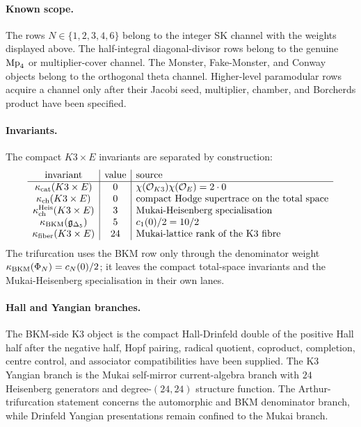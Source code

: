 \paragraph{Known scope.}
The rows $N\in\{1,2,3,4,6\}$ belong to the integer SK channel with
the weights displayed above. The half-integral diagonal-divisor rows
belong to the genuine $\mathrm{Mp}_4$ or multiplier-cover channel. The Monster,
Fake-Monster, and Conway objects belong to the orthogonal theta channel.
Higher-level paramodular rows acquire a channel only after their Jacobi
seed, multiplier, chamber, and Borcherds product have been specified.

\paragraph{Invariants.}
The compact $K3\times E$ invariants are separated by construction:
\[
\begin{array}{c|c|l}
\text{invariant} & \text{value} & \text{source}\\ \hline
\kappa_{\mathrm{cat}}(K3\times E) & 0 &
\chi(\mathcal O_{K3})\chi(\mathcal O_E)=2\cdot 0\\
\kappa_{\mathrm{ch}}(K3\times E) & 0 &
\text{compact Hodge supertrace on the total space}\\
\kappa_{\mathrm{ch}}^{\mathrm{Heis}}(K3\times E) & 3 &
\text{Mukai-Heisenberg specialisation}\\
\kappa_{\mathrm{BKM}}(\mathfrak g_{\Delta_5}) & 5 &
c_1(0)/2=10/2\\
\kappa_{\mathrm{fiber}}(K3\times E) & 24 &
\text{Mukai-lattice rank of the K3 fibre}
\end{array}
\]
The trifurcation uses the BKM row only through the denominator weight
$\kappa_{\mathrm{BKM}}(\Phi_N)=c_N(0)/2$; it leaves the compact total-space invariants
and the Mukai-Heisenberg specialisation in their own lanes.

\paragraph{Hall and Yangian branches.}
The BKM-side K3 object is the compact Hall-Drinfeld double of the
positive Hall half after the negative half, Hopf pairing, radical
quotient, coproduct, completion, centre control, and associator
compatibilities have been supplied. The K3 Yangian branch is the Mukai
self-mirror current-algebra branch with $24$ Heisenberg generators and
degree-$(24,24)$ structure function. The Arthur-trifurcation statement
concerns the automorphic and BKM denominator branch, while Drinfeld
Yangian presentations remain confined to the Mukai branch.

